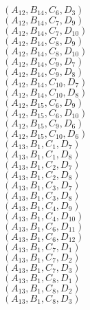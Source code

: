 \documentclass[14pt]{article}
\begin{document}
    $({A}_{12}, {B}_{14}, {C}_{6}, {D}_{3}) $ \\ 
    $({A}_{12}, {B}_{14}, {C}_{7}, {D}_{9}) $ \\ 
    $({A}_{12}, {B}_{14}, {C}_{7}, {D}_{10}) $ \\ 
    $({A}_{12}, {B}_{14}, {C}_{8}, {D}_{9}) $ \\ 
    $({A}_{12}, {B}_{14}, {C}_{8}, {D}_{10}) $ \\ 
    $({A}_{12}, {B}_{14}, {C}_{9}, {D}_{7}) $ \\ 
    $({A}_{12}, {B}_{14}, {C}_{9}, {D}_{8}) $ \\ 
    $({A}_{12}, {B}_{14}, {C}_{10}, {D}_{7}) $ \\ 
    $({A}_{12}, {B}_{14}, {C}_{10}, {D}_{8}) $ \\ 
    $({A}_{12}, {B}_{15}, {C}_{6}, {D}_{9}) $ \\ 
    $({A}_{12}, {B}_{15}, {C}_{6}, {D}_{10}) $ \\ 
    $({A}_{12}, {B}_{15}, {C}_{9}, {D}_{6}) $ \\ 
    $({A}_{12}, {B}_{15}, {C}_{10}, {D}_{6}) $ \\ 
    $({A}_{13}, {B}_{1}, {C}_{1}, {D}_{7}) $ \\ 
    $({A}_{13}, {B}_{1}, {C}_{1}, {D}_{8}) $ \\ 
    $({A}_{13}, {B}_{1}, {C}_{2}, {D}_{7}) $ \\ 
    $({A}_{13}, {B}_{1}, {C}_{2}, {D}_{8}) $ \\ 
    $({A}_{13}, {B}_{1}, {C}_{3}, {D}_{7}) $ \\ 
    $({A}_{13}, {B}_{1}, {C}_{3}, {D}_{8}) $ \\ 
    $({A}_{13}, {B}_{1}, {C}_{4}, {D}_{9}) $ \\ 
    $({A}_{13}, {B}_{1}, {C}_{4}, {D}_{10}) $ \\ 
    $({A}_{13}, {B}_{1}, {C}_{6}, {D}_{11}) $ \\ 
    $({A}_{13}, {B}_{1}, {C}_{6}, {D}_{12}) $ \\ 
    $({A}_{13}, {B}_{1}, {C}_{7}, {D}_{1}) $ \\ 
    $({A}_{13}, {B}_{1}, {C}_{7}, {D}_{2}) $ \\ 
    $({A}_{13}, {B}_{1}, {C}_{7}, {D}_{3}) $ \\ 
    $({A}_{13}, {B}_{1}, {C}_{8}, {D}_{1}) $ \\ 
    $({A}_{13}, {B}_{1}, {C}_{8}, {D}_{2}) $ \\ 
    $({A}_{13}, {B}_{1}, {C}_{8}, {D}_{3}) $ \\ 
\end{document}
